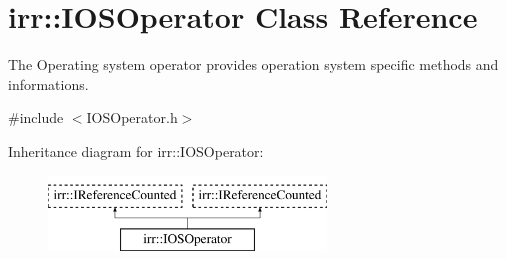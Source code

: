 \hypertarget{classirr_1_1IOSOperator}{}\section{irr\+:\+:I\+O\+S\+Operator Class Reference}
\label{classirr_1_1IOSOperator}


The Operating system operator provides operation system specific methods and informations.  




{\ttfamily \#include $<$I\+O\+S\+Operator.\+h$>$}

Inheritance diagram for irr\+:\+:I\+O\+S\+Operator\+:\begin{figure}[H]
\begin{center}
\leavevmode
\includegraphics[height=2.000000cm]{classirr_1_1IOSOperator}
\end{center}
\end{figure}
